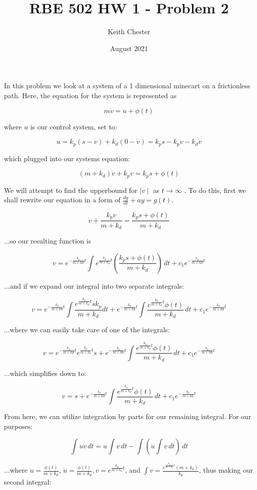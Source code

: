 \documentclass{article}
\title{RBE 502 HW 1 - Problem 2}
\author{Keith Chester}
\date{August 2021}
\begin{document}
\maketitle

In this problem we look at a system of a 1 dimensional minecart on a frictionless path. Here, the equation for the system is represented as

\[m\dot v = u +\phi(t)\]

where \(u\) is our control system, set to:

\[u=k_p(s-v)+k_d(0-\dot v)=k_ps-k_pv-k_d\dot v\]

which plugged into our systems equation:

\[(m+k_d)\dot v + k_p v = k_p s + \phi(t)\]

We will attempt to find the upperbound for \(\mid v \mid\) as \(t \to \infty\) . To do this, first we shall rewrite our equation in a form of \(\frac{dy}{dt}+ay=g(t)\).

\[\dot v + \frac{k_p v}{m+k_d}= \frac{k_p s + \phi(t)}{m+k_d}\]

...so our resulting function is

\[v = e^{-\frac{k_p}{m+kd}t} \int {e^{\frac{k_p}{m+k_d}t}(\frac{k_p s + \phi(t)}{m + k_d})} \,dt + c_1 e^{-\frac{k_p}{m+kd}t} \]

...and if we expand our integral into two separate integrals: 

\[v = e^{-\frac{k_p}{m+kd}t} \int \frac{e^{\frac{k_p}{m+k_d}t} s k_p}{m+k_d} dt + e^{-\frac{k_p}{m+kd}t} \int \frac{e^{\frac{k_p}{m+k_d}t} \phi(t)}{m + k_d} \,dt + c_1 e^{-\frac{k_p}{m+kd}t}\]

...where we can easily take care of one of the integrals:

\[v = e^{-\frac{k_p}{m+kd}t} e^{\frac{k_p}{m+k_d} t } s + e^{-\frac{k_p}{m+kd}t} \int \frac{e^{\frac{k_p}{m+k_d}t} \phi(t)}{m + k_d} \,dt + c_1 e^{-\frac{k_p}{m+kd}t}\]

...which simplifies down to:

\[v = s + e^{-\frac{k_p}{m+kd}t} \int \frac{e^{\frac{k_p}{m+k_d}t} \phi(t)}{m + k_d} \,dt + c_1 e^{-\frac{k_p}{m+kd}t}\]

From here, we can utilize integration by parts for our remaining integral. For our purposes:

\[\int u v \,dt = u \int v \,dt - \int (\dot u \int v \,dt)\,dt\]

...where \(u = \frac{\phi(t)}{m+k_d}\), \(\dot u = \frac{\dot \phi(t)}{m+k_d}, v = e^{\frac{k_p}{m+k_d}t}\), and \(\int v = \frac{e^{\frac{k_p}{m+k_d}t}(m+k_d)}{k_p}\), thus making our second integral:
\end{document}

